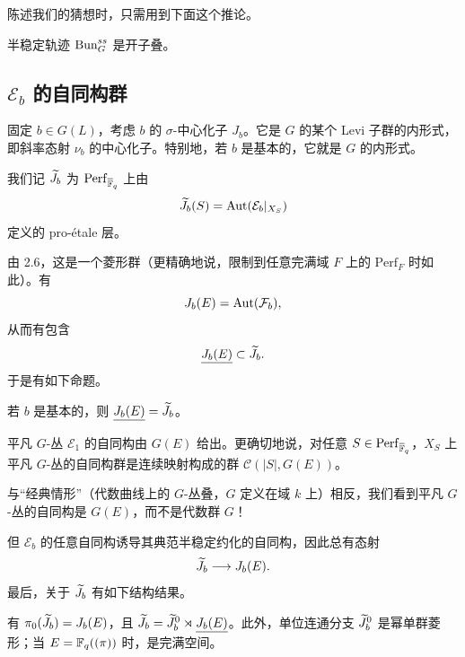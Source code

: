 
陈述我们的猜想时，只需用到下面这个推论。

\begin{corollary}\label{cor:2.18}
半稳定轨迹 $\mathrm{Bun}_G^{ss}$ 是开子叠。
\end{corollary}

\subsection{\texorpdfstring{$\mathcal{E}_b$}{E\_b} 的自同构群}%

固定 $b\in G(L)$，考虑 $b$ 的 $\sigma$-中心化子 $J_b$。它是 $G$ 的某个 Levi 子群的内形式，即斜率态射 $\nu_b$ 的中心化子。特别地，若 $b$ 是基本的，它就是 $G$ 的内形式。

\begin{definition}\label{def:2.19}
我们记 $\widetilde{J}_b$ 为 $\mathrm{Perf}_{\overline{\mathbb{F}}_q}$ 上由
\[
\widetilde{J}_b(S)=\operatorname{Aut}(\mathcal{E}_b|_{X_S})
\]
定义的 pro-étale 层。
\end{definition}

由 2.6，这是一个菱形群（更精确地说，限制到任意完满域 $F$ 上的 $\mathrm{Perf}_F$ 时如此）。有
\[
J_b(E)=\operatorname{Aut}(\mathcal{F}_b),
\]
从而有包含
\[
\underline{J_b(E)}\subset \widetilde{J}_b.
\]
于是有如下命题。

\begin{proposition}\label{prop:2.20}
若 $b$ 是基本的，则 $\underline{J_b(E)}=\widetilde{J}_b$。
\end{proposition}

\begin{example}\label{ex:2.21}
平凡 $G$-丛 $\mathcal{E}_1$ 的自同构由 $G(E)$ 给出。更确切地说，对任意 $S\in \mathrm{Perf}_{\overline{\mathbb{F}}_q}$，$X_S$ 上平凡 $G$-丛的自同构群是连续映射构成的群 $\mathcal{C}(|S|,G(E))$。
\end{example}

\begin{remark}\label{rem:2.22}
与“经典情形”（代数曲线上的 $G$-丛叠，$G$ 定义在域 $k$ 上）相反，我们看到平凡 $G$-丛的自同构是 $G(E)$，而不是代数群 $G$！
\end{remark}

但 $\mathcal{E}_b$ 的任意自同构诱导其典范半稳定约化的自同构，因此总有态射
\[
\widetilde{J}_b\longrightarrow J_b(E).
\]
最后，关于 $\widetilde{J}_b$ 有如下结构结果。

\begin{proposition}\label{prop:2.23}
有 $\pi_0(\widetilde{J}_b)=J_b(E)$，且 $\widetilde{J}_b=\widetilde{J}_b^0\rtimes\underline{J_b(E)}$。此外，单位连通分支 $\widetilde{J}_b^0$ 是幂单群菱形；当 $E=\mathbb{F}_q((\pi))$ 时，是完满空间。
\end{proposition}


